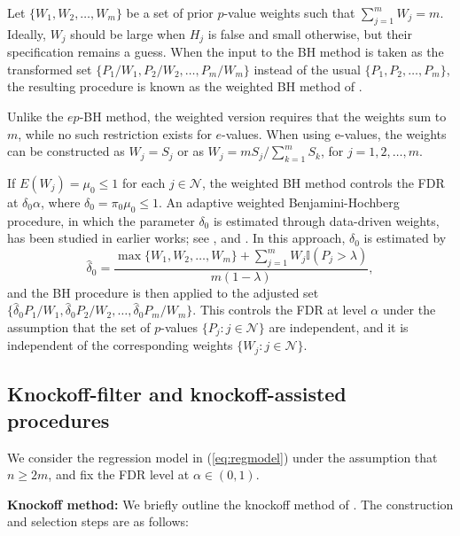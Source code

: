 \documentclass[11pt]{article}
\numberwithin{equation}{section}
\theoremstyle{plain}
\theoremstyle{remark}
\begin{document}
Let \(\{W_1, W_2, \ldots, W_m\}\) be a set of prior \(p\)-value weights such that \(\sum_{j=1}^m W_j = m\). Ideally, \(W_j\) should be large when \(H_j\) is false and small otherwise, but their specification remains a guess. When the input to the BH method is taken as the transformed set \(\{P_1/W_1, P_2/W_2, \ldots, P_m/W_m\}\) instead of the usual \(\{P_1, P_2, \ldots, P_m\}\), the resulting procedure is known as the weighted BH method of \citet{genovese2006false}.

Unlike the $ep$-BH method, the weighted version requires that the weights sum to \(m\), while no such restriction exists for \(e\)-values. When using e-values, the weights can be constructed as $W_j = S_j$ or as \(W_j = mS_j/\sum_{k=1}^m S_k\), for \(j = 1, 2, \ldots, m\).

If $E(W_j)=\mu_0\leq 1$ for each $j\in\mathcal{N}$, the weighted BH method controls the FDR at \(\delta_0\alpha\), where \(\delta_0 = \pi_0\mu_0 \leq 1\). An adaptive weighted Benjamini-Hochberg procedure, in which the parameter $\delta_0$ is estimated through data-driven weights, has been studied in earlier works; see \citet{ramdas2019unified}, and \citet{biswas2023new}. In this approach, \(\delta_0\) is estimated by
\begin{equation*}
    \hat{\delta}_0 = \frac{\max\{W_1, W_2, \ldots, W_m\} + \sum_{j=1}^m W_j\mathbb{I}(P_j > \lambda)}{m(1 - \lambda)},
\end{equation*}
and the BH procedure is then applied to the adjusted set
\(\{\hat{\delta}_0 P_1/W_1, \hat{\delta}_0 P_2/W_2, \ldots, \hat{\delta}_0 P_m/W_m\}\). This controls the FDR at level \(\alpha\) under the assumption that the set of \(p\)-values \(\{P_j : j \in \mathcal{N}\}\) are independent, and it is independent of the corresponding weights \(\{W_j : j \in \mathcal{N}\}\).


\subsection{Knockoff-filter and knockoff-assisted procedures}

We consider the regression model in (\ref{eq:regmodel}) under the assumption that $n \geq 2m$, and fix the FDR level at $\alpha \in (0,1)$. 

\textbf{Knockoff method:} We briefly outline the knockoff method of \citet{barber2015controlling}. The construction and selection steps are as follows:
\end{document}
